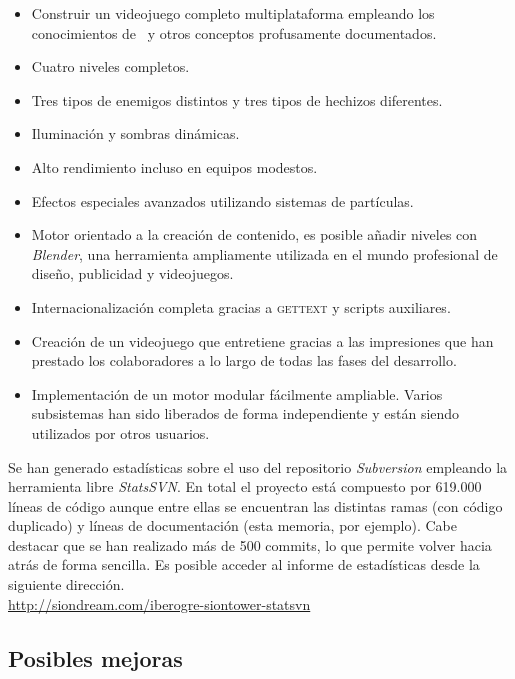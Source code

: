 \documentclass[a4paper,11pt]{article}
\begin{document}
\begin{itemize}
    \itemsep0em
    \item Construir un videojuego completo multiplataforma empleando los conocimientos de
    \wiki\ y otros conceptos profusamente documentados.
    \item Cuatro niveles completos.
    \item Tres tipos de enemigos distintos y tres tipos de hechizos diferentes.
    \item Iluminación y sombras dinámicas.
    \item Alto rendimiento incluso en equipos modestos.
    \item Efectos especiales avanzados utilizando sistemas de partículas.
    \item Motor orientado a la creación de contenido, es posible
    añadir niveles con \textit{Blender}, una herramienta ampliamente
    utilizada en el mundo profesional de diseño, publicidad y videojuegos.
    \item Internacionalización completa gracias a \textsc{gettext} y scripts auxiliares.
    \item Creación de un videojuego que entretiene gracias a las impresiones
    que han prestado los colaboradores a lo largo de todas las fases del
    desarrollo.
    \item Implementación de un motor modular fácilmente ampliable. Varios
    subsistemas han sido liberados de forma independiente y están siendo
    utilizados por otros usuarios.
\end{itemize}

\noindent Se han generado estadísticas sobre el uso del repositorio \textit{Subversion}
empleando la herramienta libre \textit{StatsSVN}.
En total el proyecto está compuesto por 619.000 líneas de código aunque
entre ellas se encuentran las distintas ramas (con código duplicado)
y líneas de documentación (esta memoria, por ejemplo). Cabe destacar
que se han realizado más de 500 commits, lo que permite volver hacia atrás
de forma sencilla. Es posible acceder al informe de estadísticas desde
la siguiente dirección.\\

\noindent \url{http://siondream.com/iberogre-siontower-statsvn}\\

\subsection{Posibles mejoras}
\end{document}

